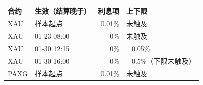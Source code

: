 \begin{tabular}{llrl}
\toprule
合约 & 生效（结算晚于） & 利息项 & 上下限 \\
\midrule
XAU & 样本起点 & 0.01\% & 未触及 \\
XAU & 01-23 08:00 & 0\% & 未触及 \\
XAU & 01-30 12:15 & 0\% & ±0.05\% \\
XAU & 01-30 16:00 & 0\% & +0.5\%（下限未触及） \\
PAXG & 样本起点 & 0.01\% & 未触及 \\
\bottomrule
\end{tabular}
